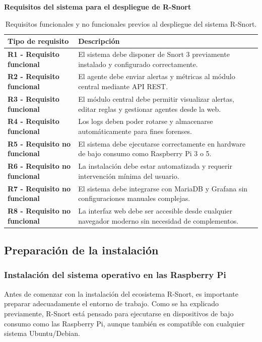 \documentclass[11pt,a4paper,twoside]{report}
\begin{document}
\noindent \textbf{Requisitos del sistema para el despliegue de R-Snort}
\begin{table}[H]
	\centering
	\begin{tabular}{|p{5.5cm}|p{8cm}|}
		\hline
		\rowcolor[HTML]{E0E0E0}
		\textbf{Tipo de requisito} & \textbf{Descripción} \\
		\hline
		\textbf{R1 - Requisito funcional} & El sistema debe disponer de Snort 3 previamente instalado y configurado correctamente. \\
		\hline
		\textbf{R2 - Requisito funcional} & El agente debe enviar alertas y métricas al módulo central mediante API REST. \\
		\hline
		\textbf{R3 - Requisito funcional} & El módulo central debe permitir visualizar alertas, editar reglas y gestionar agentes desde la web. \\
		\hline
		\textbf{R4 - Requisito funcional} & Los logs deben poder rotarse y almacenarse automáticamente para fines forenses. \\
		\hline
		\textbf{R5 - Requisito no funcional} & El sistema debe ejecutarse correctamente en hardware de bajo consumo como Raspberry Pi 3 o 5. \\
		\hline
		\textbf{R6 - Requisito no funcional} & La instalación debe estar automatizada y requerir intervención mínima del usuario. \\
		\hline
		\textbf{R7 - Requisito no funcional} & El sistema debe integrarse con MariaDB y Grafana sin configuraciones manuales complejas. \\
		\hline
		\textbf{R8 - Requisito no funcional} & La interfaz web debe ser accesible desde cualquier navegador moderno sin necesidad de complementos. \\
		\hline
	\end{tabular}
	\caption{Requisitos funcionales y no funcionales previos al despliegue del sistema R-Snort.}
	\label{tab:requisitos-rsnort}
\end{table}

\subsection{Preparación de la instalación}

\subsubsection{Instalación del sistema operativo en las Raspberry Pi}

Antes de comenzar con la instalación del ecosistema R-Snort, es importante preparar adecuadamente el entorno de trabajo. Como se ha explicado previamente, R-Snort está pensado para ejecutarse en dispositivos de bajo consumo como las Raspberry Pi, aunque también es compatible con cualquier sistema Ubuntu/Debian.\newline
\end{document}

